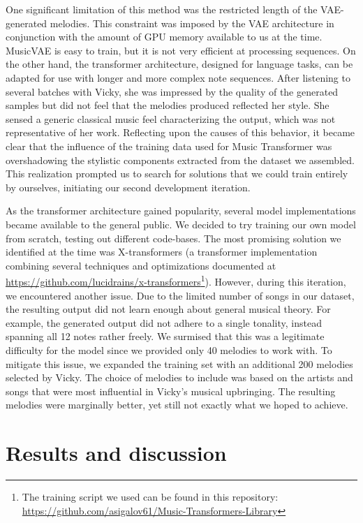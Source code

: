 One significant limitation of this method was the restricted length of the VAE-generated melodies. This constraint was imposed by the VAE architecture in conjunction with the amount of GPU memory available to us at the time. MusicVAE is easy to train, but it is not very efficient at processing sequences. On the other hand, the transformer architecture, designed for language tasks, can be adapted for use with longer and more complex note sequences. After listening to several batches with Vicky, she was impressed by the quality of the generated samples but did not feel that the melodies produced reflected her style. She sensed a generic classical music feel characterizing the output, which was not representative of her work. Reflecting upon the causes of this behavior, it became clear that the influence of the training data used for Music Transformer was overshadowing the stylistic components extracted from the dataset we assembled. This realization prompted us to search for solutions that we could train entirely by ourselves, initiating our second development iteration.

As the transformer architecture gained popularity, several model implementations became available to the general public. We decided to try training our own model from scratch, testing out different code-bases. The most promising solution we identified at the time was X-transformers (a transformer implementation combining several techniques and optimizations documented at \url{https://github.com/lucidrains/x-transformers}\footnote{The training script we used can be found in this repository: \url{https://github.com/asigalov61/Music-Transformers-Library}}). However, during this iteration, we encountered another issue. Due to the limited number of songs in our dataset, the resulting output did not learn enough about general musical theory. For example, the generated output did not adhere to a single tonality, instead spanning all 12 notes rather freely. We surmised that this was a legitimate difficulty for the model since we provided only 40 melodies to work with. To mitigate this issue, we expanded the training set with an additional 200 melodies selected by Vicky. The choice of melodies to include was based on the artists and songs that were most influential in Vicky's musical upbringing. The resulting melodies were marginally better, yet still not exactly what we hoped to achieve.

\section{Results and discussion}

